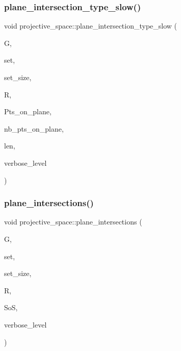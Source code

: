 \subsubsection{\texorpdfstring{plane\+\_\+intersection\+\_\+type\+\_\+slow()}{plane\_intersection\_type\_slow()}}
{\footnotesize\ttfamily void projective\+\_\+space\+::plane\+\_\+intersection\+\_\+type\+\_\+slow (\begin{DoxyParamCaption}\item[{\mbox{\hyperlink{classgrassmann}{grassmann}} $\ast$}]{G,  }\item[{\mbox{\hyperlink{galois_8h_a09fddde158a3a20bd2dcadb609de11dc}{I\+NT}} $\ast$}]{set,  }\item[{\mbox{\hyperlink{galois_8h_a09fddde158a3a20bd2dcadb609de11dc}{I\+NT}}}]{set\+\_\+size,  }\item[{\mbox{\hyperlink{classlonginteger__object}{longinteger\+\_\+object}} $\ast$\&}]{R,  }\item[{\mbox{\hyperlink{galois_8h_a09fddde158a3a20bd2dcadb609de11dc}{I\+NT}} $\ast$$\ast$\&}]{Pts\+\_\+on\+\_\+plane,  }\item[{\mbox{\hyperlink{galois_8h_a09fddde158a3a20bd2dcadb609de11dc}{I\+NT}} $\ast$\&}]{nb\+\_\+pts\+\_\+on\+\_\+plane,  }\item[{\mbox{\hyperlink{galois_8h_a09fddde158a3a20bd2dcadb609de11dc}{I\+NT}} \&}]{len,  }\item[{\mbox{\hyperlink{galois_8h_a09fddde158a3a20bd2dcadb609de11dc}{I\+NT}}}]{verbose\+\_\+level }\end{DoxyParamCaption})}

\mbox{\label{classprojective__space_a22f16785983fa60d7c91051e54cd7e7b}} 
\subsubsection{\texorpdfstring{plane\+\_\+intersections()}{plane\_intersections()}}
{\footnotesize\ttfamily void projective\+\_\+space\+::plane\+\_\+intersections (\begin{DoxyParamCaption}\item[{\mbox{\hyperlink{classgrassmann}{grassmann}} $\ast$}]{G,  }\item[{\mbox{\hyperlink{galois_8h_a09fddde158a3a20bd2dcadb609de11dc}{I\+NT}} $\ast$}]{set,  }\item[{\mbox{\hyperlink{galois_8h_a09fddde158a3a20bd2dcadb609de11dc}{I\+NT}}}]{set\+\_\+size,  }\item[{\mbox{\hyperlink{classlonginteger__object}{longinteger\+\_\+object}} $\ast$\&}]{R,  }\item[{\mbox{\hyperlink{classset__of__sets}{set\+\_\+of\+\_\+sets}} \&}]{SoS,  }\item[{\mbox{\hyperlink{galois_8h_a09fddde158a3a20bd2dcadb609de11dc}{I\+NT}}}]{verbose\+\_\+level }\end{DoxyParamCaption})}

